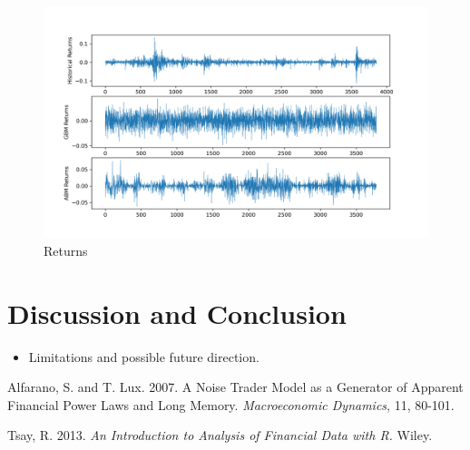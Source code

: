 \documentclass[11pt]{article}
\begin{document}
\begin{figure}
\begin{center}
\includegraphics[scale=0.6, trim=0cm 1.5cm 0cm 1cm]{returns.png} %
\end{center}
\caption{Returns}
\label{fig:returns}
\end{figure}



















\section{Discussion and Conclusion}

\begin{itemize}
\item Limitations and possible future direction.
\end{itemize}

























\begin{thebibliography}{99} 

Alfarano, S. and T. Lux. 2007. A Noise Trader Model as a Generator of Apparent Financial Power Laws and Long Memory. {\em Macroeconomic Dynamics}, 11, 80-101.

Tsay, R. 2013. {\em An Introduction to Analysis of Financial Data with R.} Wiley. 

\end{thebibliography}
\end{document}
